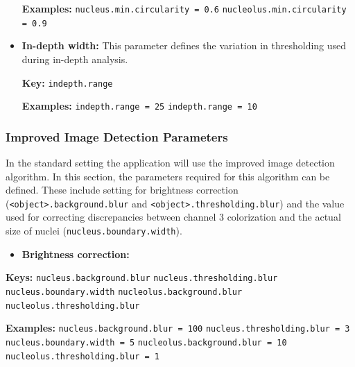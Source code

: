 \documentclass[a4paper, 12pt, twoside]{article}
\newcommand{\code}[1]{\colorbox{codegray}{\texttt{#1}}}
\begin{document}
\begin{itemize}
  \textbf{Examples:}
  \newline \code{nucleus.min.circularity = 0.6}
  \newline \code{nucleolus.min.circularity = 0.9}
  
  \item \textbf{In-depth width:} This parameter defines the variation in
  thresholding used during in-depth analysis.
  
  \textbf{Key:}
  \newline \code{indepth.range}
  
  \textbf{Examples:}
  \newline \code{indepth.range = 25}
  \newline \code{indepth.range = 10}
  
\end{itemize}

\subsubsection{Improved Image Detection Parameters}
In the standard setting the application will use the improved image detection
algorithm. In this section, the parameters required for this algorithm can be
defined. These include setting for brightness correction
(\code{<object>.background.blur} and \code{<object>.thresholding.blur}) and the
value used for correcting discrepancies between channel 3 colorization and the
actual size of nuclei (\code{nucleus.boundary.width}).

\begin{itemize}
  \item \textbf{Brightness correction:}
\end{itemize}

\textbf{Keys:}
\newline \code{nucleus.background.blur}
\newline \code{nucleus.thresholding.blur}
\newline \code{nucleus.boundary.width}
\newline \code{nucleolus.background.blur}
\newline \code{nucleolus.thresholding.blur}

\textbf{Examples:}
\newline \code{nucleus.background.blur = 100}
\newline \code{nucleus.thresholding.blur = 3}
\newline \code{nucleus.boundary.width = 5}
\newline \code{nucleolus.background.blur = 10}
\newline \code{nucleolus.thresholding.blur = 1}
\end{document}
